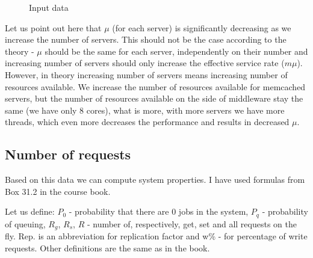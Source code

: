 \documentclass[11pt]{article}
\newcommand{\rowstyle}[1]{\gdef\currentrowstyle{#1}%
  #1\ignorespaces
}
\begin{document}
\begin{figure}
\begin{center}
\end{center}
\caption{Input data}
\label{fig:input}
\end{figure}

Let us point out here that $\mu$ (for each server) is significantly decreasing as we increase the number of servers. This should not be the case according to the theory - $\mu$ should be the same for each server, independently on their number and increasing number of servers should only increase the effective service rate ($m\mu$). However, in theory increasing number of servers means increasing number of resources available. We increase the number of resources available for memcached servers, but the number of resources available on the side of middleware stay the same (we have only 8 cores), what is more, with more servers we have more threads, which even more decreases the performance and results in decreased $\mu$.

\subsection{Number of requests}

Based on this data we can compute system properties. I have used formulas from Box 31.2 in the course book.

Let us define: $P_0$ - probability that there are 0 jobs in the system, $P_q$ - probability of queuing, $R_g$, $R_s$, $R$ - number of, respectively, get, set and all requests on the fly. Rep. is an abbreviation for replication factor and w\% - for percentage of write requests. Other definitions are the same as in the book.
\end{document}

